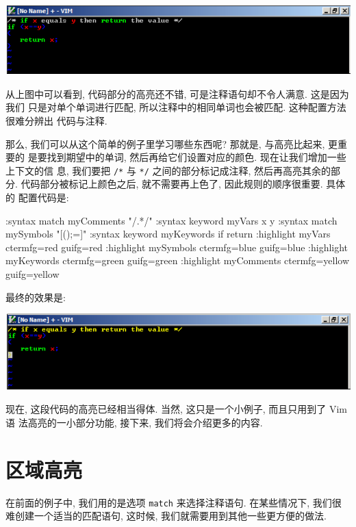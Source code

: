 \begin{center}
    \includegraphics[scale=0.5]{./images/page142.png}
\end{center}

从上图中可以看到, 代码部分的高亮还不错, 可是注释语句却不令人满意. 这是因为我们
只是对单个单词进行匹配, 所以注释中的相同单词也会被匹配. 这种配置方法很难分辨出
代码与注释.

那么, 我们可以从这个简单的例子里学习哪些东西呢? 那就是, 与高亮比起来, 更重要的
是要找到期望中的单词, 然后再给它们设置对应的颜色. 现在让我们增加一些上下文的信
息, 我们要把 \verb'/*' 与 \verb'*/' 之间的部分标记成注释, 然后再高亮其余的部
分. 代码部分被标记上颜色之后, 就不需要再上色了, 因此规则的顺序很重要. 具体的
配置代码是:
\begin{vimcode}
:syntax match myComments "/\*.*\*/"
:syntax keyword myVars x y
:syntax match mySymbols "[{}();=]"
:syntax keyword myKeywords if return
:highlight myVars ctermfg=red guifg=red
:highlight mySymbols ctermfg=blue guifg=blue
:highlight myKeywords ctermfg=green guifg=green
:highlight myComments ctermfg=yellow guifg=yellow
\end{vimcode}
最终的效果是:
\begin{center}
\includegraphics[scale=0.5]{./images/page143.png}
\end{center}

现在, 这段代码的高亮已经相当得体. 当然, 这只是一个小例子, 而且只用到了 Vim 语
法高亮的一小部分功能, 接下来, 我们将会介绍更多的内容.

\section{区域高亮}
\label{sec:syntax_regions}

在前面的例子中, 我们用的是选项 \texttt{match} 来选择注释语句. 在某些情况下,
我们很难创建一个适当的匹配语句, 这时候, 我们就需要用到其他一些更方便的做法.

